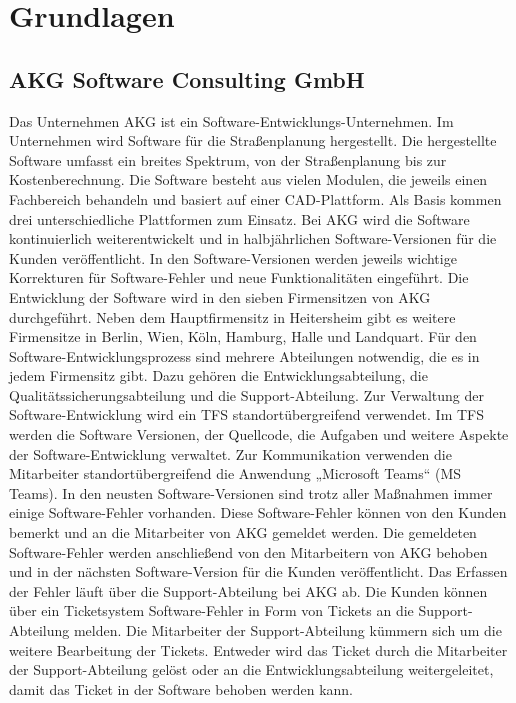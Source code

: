 \section{Grundlagen}
\label{sec:Grundlagen}

\subsection{AKG Software Consulting GmbH}
Das Unternehmen AKG ist ein Software-Entwicklungs-Unternehmen. Im Unternehmen wird Software für die Straßenplanung hergestellt. Die hergestellte Software umfasst ein breites Spektrum, von der Straßenplanung bis zur Kostenberechnung. Die Software besteht aus vielen Modulen, die jeweils einen Fachbereich behandeln und basiert auf
einer CAD-Plattform. Als Basis kommen drei unterschiedliche Plattformen zum Einsatz. Bei AKG wird die Software kontinuierlich weiterentwickelt und in halbjährlichen
Software-Versionen für die Kunden veröffentlicht. In den Software-Versionen werden jeweils wichtige Korrekturen für Software-Fehler und neue Funktionalitäten eingeführt. Die Entwicklung der Software wird in den sieben Firmensitzen von AKG durchgeführt. Neben dem Hauptfirmensitz in Heitersheim gibt es weitere Firmensitze in Berlin, Wien, Köln, Hamburg, Halle und Landquart. Für den Software-Entwicklungsprozess sind mehrere Abteilungen notwendig, die es in jedem Firmensitz gibt. Dazu gehören die Entwicklungsabteilung, die Qualitätssicherungsabteilung und die Support-Abteilung. Zur Verwaltung der Software-Entwicklung wird ein \ac{TFS} standortübergreifend verwendet. Im \ac{TFS} werden die Software Versionen, der Quellcode, die Aufgaben und weitere Aspekte der Software-Entwicklung verwaltet. Zur Kommunikation verwenden die Mitarbeiter standortübergreifend die Anwendung „Microsoft Teams“ (MS Teams). In den neusten Software-Versionen sind trotz aller Maßnahmen immer einige Software-Fehler vorhanden. Diese Software-Fehler können von den Kunden bemerkt und an die Mitarbeiter von AKG gemeldet werden. Die gemeldeten Software-Fehler werden anschließend von den Mitarbeitern von AKG behoben und in der nächsten Software-Version für die Kunden veröffentlicht. Das Erfassen der Fehler läuft über die Support-Abteilung bei AKG ab. Die Kunden können über ein Ticketsystem Software-Fehler in Form von Tickets an die Support-Abteilung melden. Die Mitarbeiter der Support-Abteilung kümmern sich um die weitere Bearbeitung der Tickets. Entweder wird das Ticket durch die Mitarbeiter der Support-Abteilung gelöst oder an die Entwicklungsabteilung weitergeleitet, damit das Ticket in der Software behoben werden kann.

